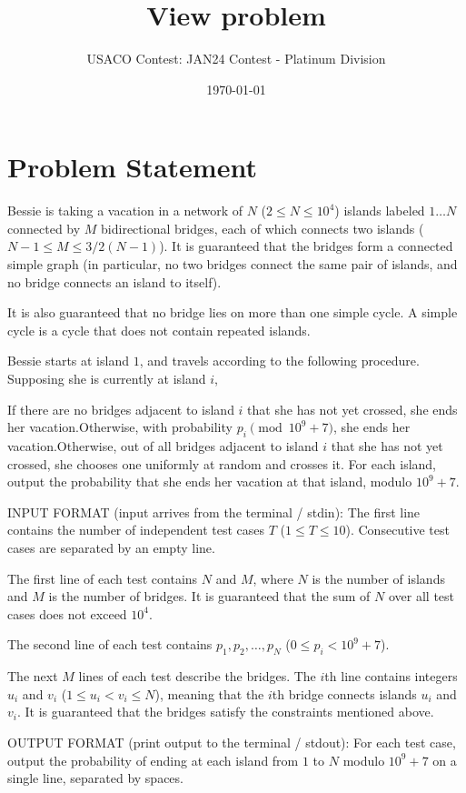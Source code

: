 \documentclass[12pt]{article}
\title{View problem}
\author{USACO Contest: JAN24 Contest - Platinum Division}
\date{\today}
\begin{document}
\maketitle

\section*{Problem Statement}


Bessie is taking a vacation in a network of $N$ ($2\le N\le 10^4$) islands
labeled $1\dots N$ connected by $M$ bidirectional bridges, each of which
connects two islands ($N-1\le M\le 3/2(N-1)$). It is guaranteed that the bridges
form a connected simple graph (in particular, no two bridges connect the same
pair of islands, and no bridge connects an island to itself).

It is also guaranteed that no bridge lies on more than one simple cycle. A
simple cycle is a cycle that does not contain repeated islands.

Bessie starts at island $1$, and travels according to the following procedure.
Supposing she is currently at island $i$,

If there are no bridges adjacent to island $i$ that she has not yet crossed,
she ends her vacation.Otherwise, with probability $p_i\pmod{10^9+7}$, she ends her vacation.Otherwise, out of all bridges adjacent to island $i$ that she has not yet
crossed, she chooses one uniformly at random and crosses it.
For each island, output the probability that she ends her vacation at that
island, modulo $10^9+7$.

INPUT FORMAT (input arrives from the terminal / stdin):
The first line contains the number of independent test cases $T$
($1\le T\le 10$). Consecutive test cases are separated by an empty line.

The first line of each test contains $N$ and $M$, where $N$ is the number of
islands and $M$ is the number of bridges. It is guaranteed that the sum of $N$
over all test cases does not exceed $10^4$.

The second line of each test contains $p_1, p_2,\dots, p_N$ ($0\le p_i<10^9+7$).

The next $M$ lines of each test describe the bridges. The $i$th line contains
integers $u_i$ and $v_i$ ($1\le u_i<v_i\le N$), meaning that the $i$th  bridge
connects islands $u_i$ and $v_i$. It is guaranteed that the bridges satisfy the
constraints mentioned above.

OUTPUT FORMAT (print output to the terminal / stdout):
For each test case, output the probability of ending at each island from $1$ to
$N$ modulo $10^9+7$ on a single line, separated by spaces.
\end{document}
